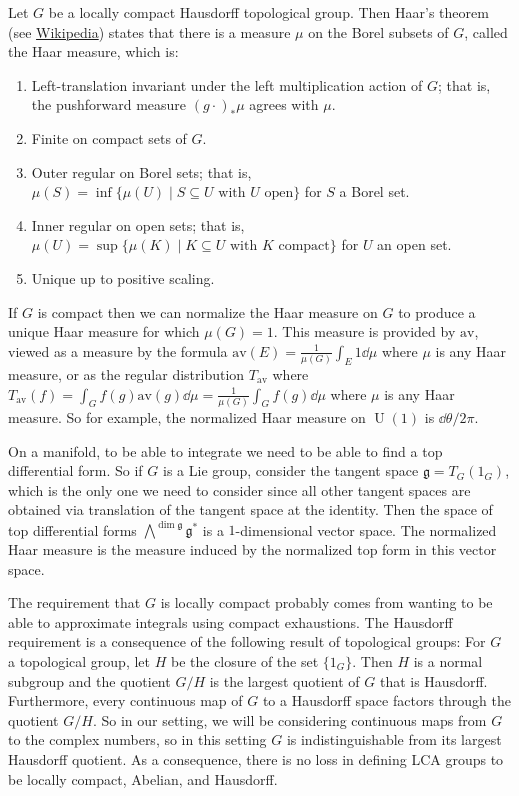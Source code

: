 \documentclass[11pt,leqno]{article}
\theoremstyle{plain}
\theoremstyle{definition}
\numberwithin{equation}{section}
\numberwithin{lem}{section}
\DeclareMathOperator{\U}{U}
\newcommand{\av}{\mathrm{av}}
\begin{document}
Let $G$ be a locally compact Hausdorff topological group. Then Haar's theorem (see \href{https://en.wikipedia.org/wiki/Haar_measure}{Wikipedia}) states that there is a measure $\mu$ on the Borel subsets of $G$, called the Haar measure, which is:
\begin{enumerate}
	\item Left-translation invariant under the left multiplication action of $G$; that is, the pushforward measure $(g\cdot)_\ast \mu$ agrees with $\mu$.
	\item Finite on compact sets of $G$.
	\item Outer regular on Borel sets; that is, $\mu(S) = \inf\{\mu(U)\mid S\subseteq U\text{ with $U$ open}\}$ for $S$ a Borel set. 
	\item Inner regular on open sets; that is, $\mu(U) = \sup\{\mu(K)\mid K\subseteq U\text{ with $K$ compact}\}$ for $U$ an open set.
	\item Unique up to positive scaling.
\end{enumerate}

If $G$ is compact then we can normalize the Haar measure on $G$ to produce a unique Haar measure for which $\mu(G) = 1$. This measure is provided by $\av$, viewed as a measure by the formula $\av(E) = \frac{1}{\mu(G)}\int_E 1 \dd\mu$ where $\mu$ is any Haar measure, or as the regular distribution $T_\av$ where $T_\av(f) = \int_G f(g)\av(g)\dd\mu = \frac{1}{\mu(G)}\int_G f(g) \dd\mu$ where $\mu$ is any Haar measure. So for example, the normalized Haar measure on $\U(1)$ is $\dd\theta/2\pi$.

On a manifold, to be able to integrate we need to be able to find a top differential form. So if $G$ is a Lie group, consider the tangent space $\mathfrak g = T_G(1_G)$, which is the only one we need to consider since all other tangent spaces are obtained via translation of the tangent space at the identity. Then the space of top differential forms $\bigwedge^{\dim \mathfrak g}\mathfrak g^\ast$ is a $1$-dimensional vector space. The normalized Haar measure is the measure induced by the normalized top form in this vector space.

The requirement that $G$ is locally compact probably comes from wanting to be able to approximate integrals using compact exhaustions. The Hausdorff requirement is a consequence of the following result of topological groups: For $G$ a topological group, let $H$ be the closure of the set $\{1_G\}$. Then $H$ is a normal subgroup and the quotient $G/H$ is the largest quotient of $G$ that is Hausdorff. Furthermore, every continuous map of $G$ to a Hausdorff space factors through the quotient $G/H$. So in our setting, we will be considering continuous maps from $G$ to the complex numbers, so in this setting $G$ is indistinguishable from its largest Hausdorff quotient. As a consequence, there is no loss in defining LCA groups to be locally compact, Abelian, and Hausdorff.
\end{document}
